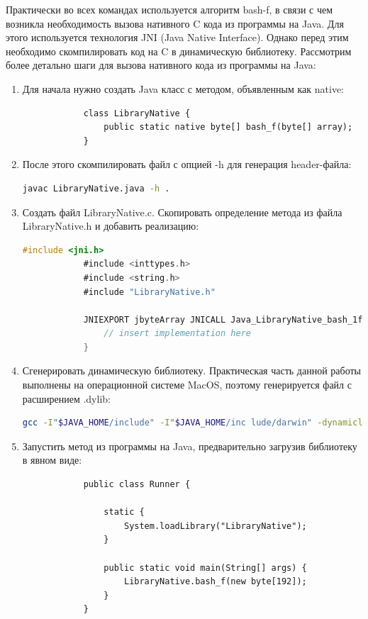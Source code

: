 	Практически во всех командах используется алгоритм bash-f, в связи с чем возникла необходимость
	вызова нативного C кода из программы на Java. Для этого используется технология JNI (Java 
	Native Interface). Однако перед этим необходимо скомпилировать код на C в динамическую библиотеку.
	Рассмотрим более детально шаги для вызова нативного кода из программы на Java:
	
	\begin{enumerate}
		\item Для начала нужно создать Java класс с методом, объявленным как native:
		\begin{lstlisting}
			class LibraryNative {
				public static native byte[] bash_f(byte[] array);
			}
		\end{lstlisting}
		\item После этого скомпилировать файл с опцией -h для генерация header-файла:
		\begin{lstlisting}[language=Bash]
			javac LibraryNative.java -h .
		\end{lstlisting}
		\item Создать файл LibraryNative.c. Скопировать определение метода из файла LibraryNative.h
		и добавить реализацию:
		\begin{lstlisting}[language=C]
			#include <jni.h>
			#include <inttypes.h>
			#include <string.h>
			#include "LibraryNative.h"
			
			JNIEXPORT jbyteArray JNICALL Java_LibraryNative_bash_1f(JNIEnv *env, jclass thisClass, jbyteArray inJNIArray) {
				// insert implementation here
			}
		\end{lstlisting}
		\item Сгенерировать динамическую библиотеку. Практическая часть данной работы выполнены на 
		операционной системе MacOS, поэтому генерируется файл с расширением .dylib:
		\begin{lstlisting}[language=Bash]
			gcc -I"$JAVA_HOME/include" -I"$JAVA_HOME/inc lude/darwin" -dynamiclib -o libLibraryNative.dylib LibraryNative.c
		\end{lstlisting}
		\item Запустить метод из программы на Java, предварительно загрузив библиотеку в явном виде:
		\begin{lstlisting}
			public class Runner {
				
				static {
					System.loadLibrary("LibraryNative");
				}
			
				public static void main(String[] args) {
					LibraryNative.bash_f(new byte[192]);
				}
			}
		\end{lstlisting}
	\end{enumerate}

